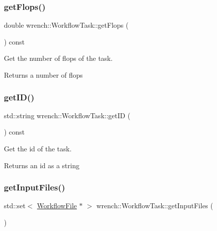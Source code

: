 \subsubsection{\texorpdfstring{get\+Flops()}{getFlops()}}
{\footnotesize\ttfamily double wrench\+::\+Workflow\+Task\+::get\+Flops (\begin{DoxyParamCaption}{ }\end{DoxyParamCaption}) const}



Get the number of flops of the task. 

\begin{DoxyReturn}{Returns}
a number of flops 
\end{DoxyReturn}
\mbox{\label{classwrench_1_1_workflow_task_a18ce8967b4b59d2d231a1218a8d3b813}} 
\subsubsection{\texorpdfstring{get\+I\+D()}{getID()}}
{\footnotesize\ttfamily std\+::string wrench\+::\+Workflow\+Task\+::get\+ID (\begin{DoxyParamCaption}{ }\end{DoxyParamCaption}) const}



Get the id of the task. 

\begin{DoxyReturn}{Returns}
an id as a string 
\end{DoxyReturn}
\mbox{\label{classwrench_1_1_workflow_task_a1baf5564a8a03ec475b42064e1940eaa}} 
\subsubsection{\texorpdfstring{get\+Input\+Files()}{getInputFiles()}}
{\footnotesize\ttfamily std\+::set$<$ \hyperlink{classwrench_1_1_workflow_file}{Workflow\+File} $\ast$ $>$ wrench\+::\+Workflow\+Task\+::get\+Input\+Files (\begin{DoxyParamCaption}{ }\end{DoxyParamCaption})}



